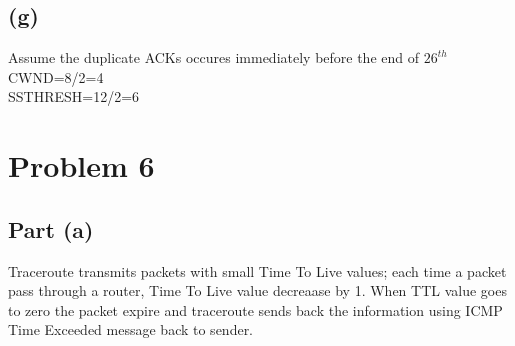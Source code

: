 \documentclass[11pt]{article}
\begin{document}
\subsection*{(g)}
Assume the duplicate ACKs occures immediately before the end of $26^{th}$\\
CWND=8/2=4\\
SSTHRESH=12/2=6
\label{pg:end-of-p5}



%


\newpage


\section*{Problem 6}

\subsection*{Part (a)}
Traceroute transmits packets with small Time To Live values; each time a packet pass through a router, Time To Live value decreaase by 1. When TTL value goes to zero the packet expire and traceroute sends back the information using ICMP Time Exceeded message back to sender.
\end{document}
